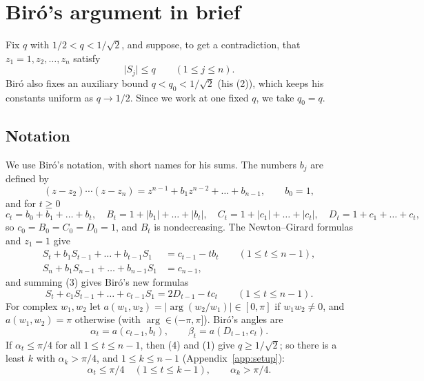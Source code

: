 \documentclass[11pt]{amsart}
\theoremstyle{remark}
\theoremstyle{plain}
\newcommand{\abs}[1]{\lvert #1\rvert}
\begin{document}
\section{Bir\'o's argument in brief}\label{sec:biro}

Fix $q$ with $1/2<q<1/\sqrt2$, and suppose, to get a contradiction, that $z_1=1,z_2,\dots,z_n$ satisfy
\begin{equation}\tag{1}
  \abs{S_j}\le q\qquad(1\le j\le n).
\end{equation}
Bir\'o also fixes an auxiliary bound $q<q_0<1/\sqrt2$ (his (2)), which keeps his constants uniform as $q\to1/2$. Since we work at one fixed $q$, we take $q_0=q$.

\subsection*{Notation}
We use Bir\'o's notation, with short names for his sums. The numbers $b_j$ are defined by
\[
(z-z_2)\cdots(z-z_n)=z^{n-1}+b_1z^{n-2}+\dots+b_{n-1},\qquad b_0=1,
\]
and for $t\ge0$
\[
c_t=b_0+b_1+\dots+b_t,\quad B_t=1+\abs{b_1}+\dots+\abs{b_t},\quad C_t=1+\abs{c_1}+\dots+\abs{c_t},\quad D_t=1+c_1+\dots+c_t,
\]
so $c_0=B_0=C_0=D_0=1$, and $B_t$ is nondecreasing. The Newton--Girard formulas and $z_1=1$ give \cite{Bir94}
\begin{align}
  S_t+b_1S_{t-1}+\dots+b_{t-1}S_1&=c_{t-1}-tb_t\qquad(1\le t\le n-1),\tag{3}\\
  S_n+b_1S_{n-1}+\dots+b_{n-1}S_1&=c_{n-1},\tag{4}
\end{align}
and summing (3) gives Bir\'o's new formulas
\begin{equation}\tag{14}
  S_t+c_1S_{t-1}+\dots+c_{t-1}S_1=2D_{t-1}-tc_t\qquad(1\le t\le n-1).
\end{equation}
For complex $w_1,w_2$ let $a(w_1,w_2)=\abs{\arg(w_2/w_1)}\in[0,\pi]$ if $w_1w_2\ne0$, and $a(w_1,w_2)=\pi$ otherwise (with $\arg\in(-\pi,\pi]$). Bir\'o's angles are
\[
\alpha_t=a(c_{t-1},b_t),\qquad \beta_t=a(D_{t-1},c_t).
\]
If $\alpha_t\le\pi/4$ for all $1\le t\le n-1$, then (4) and (1) give $q\ge1/\sqrt2$; so there is a least $k$ with $\alpha_k>\pi/4$, and $1\le k\le n-1$ (Appendix~\ref{app:setup}):
\begin{equation}\tag{5, 6}
  \alpha_t\le\pi/4\quad(1\le t\le k-1),\qquad \alpha_k>\pi/4 .
\end{equation}
\end{document}
